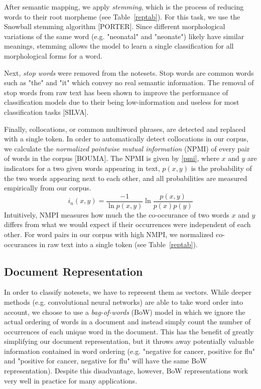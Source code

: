 \documentclass[conference]{IEEEtran}
\begin{document}
After semantic mapping, we apply \textit{stemming}, which is the process of reducing words to their root morpheme (see Table~\ref{reptab}). For this task, we use the Snowball stemming algorithm [PORTER]. Since different morphological variations of the same word (e.g. "neonatal" and "neonate") likely have similar meanings, stemming allows the model to learn  a single classification for all morphological forms for a word.

Next, \textit{stop words} were removed from the notesets. Stop words are common words such as "the" and "it" which convey no real semantic information. The removal of stop words from raw text has been shown to improve the performance of classification models due to their being low-information and useless for most classification tasks [SILVA]. 

Finally, collocations, or common multiword phrases, are detected and replaced with a single token. In order to automatically detect collocations in our corpus, we calculate the \textit{normalized pointwise mutual information} (NPMI) of every pair of words in the corpus [BOUMA]. The NPMI is given by \eqref{pmi}, where $x$ and $y$ are indicators for a two given words appearing in text, $p(x,y)$ is the probability of the two words appearing next to each other, and all probabilities are measured empirically from our corpus.
\begin{equation}
i_n(x,y) = \frac{-1}{\ln p(x,y)}\ln \frac{p(x,y)}{p(x)p(y)}\label{pmi}
\end{equation}
Intuitively, NMPI measures how much the the co-occurance of two words $x$ and $y$ differs from what we would expect if their occurrences were independent of each other. For word pairs in our corpus with high NMPI, we normalized co-occurances in raw text into a single token (see Table~\ref{reptab}).
\subsection{Document Representation}\label{AA}
In order to classify notesets, we have to represent them as vectors. While deeper methods (e.g. convolutional neural networks) are able to take word order into account, we choose to use a \textit{bag-of-words} (BoW) model in which we ignore the actual ordering of words in a document and instead simply count the number of occurrences of each unique word in the document. This has the benefit of greatly simplifying our document representation, but it throws away potentially valuable information contained in word ordering (e.g. "negative for cancer, positive for flu" and "positive for cancer, negative for flu" will have the same BoW representation). Despite this disadvantage, however, BoW representations work very well in practice for many applications.
\end{document}
